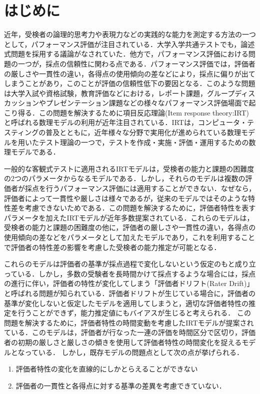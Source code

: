 \documentclass[a4paper,11pt,oneside,openany]{jsbook}
\begin{document}
\newpage
\chapter{はじめに}
近年，受検者の論理的思考力や表現力などの実践的な能力を測定する方法の一つとして，パフォーマンス評価が注目されている．大学入学共通テストでも，論述式問題を採用する議論がなされていた．他方で，パフォーマンス評価における問題の一つが，採点の信頼性に関わる点である．パフォーマンス評価では，評価者の厳しさや一貫性の違い，各得点の使用傾向の差などにより，採点に偏りが出てしまうことがあり，このことが評価の信頼性低下の要因となる．このような問題は大学入試や資格試験，教育評価などにおける，レポート課題，グループディスカッションやプレゼンテーション課題などの様々なパフォーマンス評価場面で起こり得る．この問題を解決するために項目反応理論(Item response theory:IRT)\cite{IRTtext,IRTLord}と呼ばれる数理モデルの利用が近年注目されている．IRTは，コンピュータ・テスティングの普及とともに，近年様々な分野で実用化が進められている数理モデルを用いたテスト理論の一つで，テストを作成・実施・評価・運用するための数理モデルである．

一般的な客観式テストに適用されるIRTモデルは，受検者の能力と課題の困難度の2つのパラメータからなるモデル\cite{rash}である．しかし，それらのモデルは複数の評価者が採点を行うパフォーマンス評価には適用することができない．なぜなら，評価者によって一貫性や厳しさは様々であるが，従来のモデルではそのような特性差を考慮できないためである．この問題を解決するために，評価者特性を表すパラメータを加えたIRTモデルが近年多数提案されている\cite{raterRash,rater2,rater3,Patz}．これらのモデルは，受検者の能力と課題の困難度の他に，評価者の厳しさや一貫性の違い，各得点の使用傾向の差などをパラメータとして加えたモデルであり，これを利用することで評価者の特性差の影響を考慮した受検者の能力推定が可能となる．

これらのモデルは評価者の基準が採点過程で変化しないという仮定のもと成り立っている．しかし，多数の受験者を長時間かけて採点するような場合には，採点の進行に伴い，評価者の特性が変化してしまう「評価者ドリフト(Rater Drift)」と呼ばれる問題が知られている．評価者ドリフトが生じている場合に，評価者の基準が変化しないと仮定したモデルを適用してしまうと，適切な評価者特性の推定を行うことができず，能力推定値にもバイアスが生じると考えられる．
この問題を解決するために，評価者特性の時間変動を考慮したIRTモデルが提案されている\cite{raterdrift}．このモデルは，評価者が行なった一連の評価を時間区分で区切り，評価者の初期の厳しさと厳しさの傾きを使用して評価者特性の時間変化を捉えるモデルとなっている．
しかし，既存モデルの問題点として次の点が挙げられる．
\begin{enumerate}
  \item 評価者特性の変化を直線的にしかとらえることができない
  \item 評価者の一貫性と各得点に対する基準の差異を考慮できていない．
\end{enumerate}  
\end{document}
